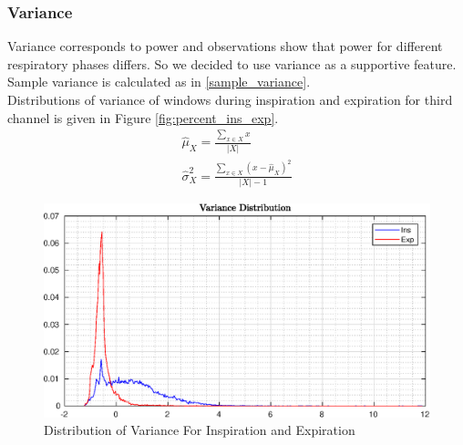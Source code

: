 \subsubsection{Variance}
Variance corresponds to power and observations show that power for different respiratory phases differs. So we decided to use variance as a supportive feature. Sample variance is calculated as in \eqref{sample_variance}. \\ Distributions of variance of windows during inspiration and expiration for third channel is given in Figure \ref{fig:percent_ins_exp}.
\begin{align}
	\hat{\mu}_{X} = \frac{\sum_{x \in X}x}{|X|} \label{sample_mean} \\
	\hat{\sigma}_{X}^2 = \frac{\sum_{x \in X}(x-\hat{\mu}_X)^2}{|X|-1}\label{sample_variance}
\end{align}
\begin{figure}
	\begin{center}
		\includegraphics[width=\textwidth]{figures/variance_ins_exp.eps}
		\caption{Distribution of Variance For Inspiration and Expiration}
		\label{fig:variance_ins_exp}
	\end{center}
\end{figure}
